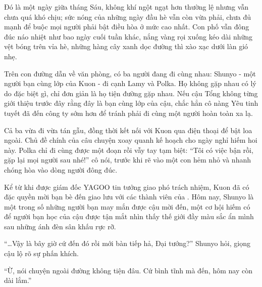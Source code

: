 \documentclass[../main.tex]{subfiles}
\begin{document}

Đó là một ngày giữa tháng Sáu, không khí ngột ngạt hơn thường lệ nhưng vẫn chưa quá khó chịu; sức nóng của những ngày đầu hè vẫn còn vừa phải, chưa đủ mạnh để buộc mọi người phải bật điều hòa ở mức cao nhất. Con phố vẫn đông đúc náo nhiệt như bao ngày cuối tuần khác, nắng vàng rọi xuống kéo dài những vệt bóng trên vỉa hè, những hàng cây xanh dọc đường thì xào xạc dưới làn gió nhẹ.

Trên con đường dẫn về văn phòng, có ba người đang đi cùng nhau: Shunyo - một người bạn cùng lớp của Kuon - đi cạnh Lamy và Polka. Họ không gặp nhau có lý do đặc biệt gì, chỉ đơn giản là họ tiện đường gặp nhau. Nếu cậu Tổng không từng giới thiệu trước đây rằng đây là bạn cùng lớp của cậu, chắc hẳn cô nàng Yêu tinh tuyết đã đến công ty sớm hơn để tránh phải đi cùng một người hoàn toàn xa lạ.

Cả ba vừa đi vừa tán gẫu, đồng thời kết nối với Kuon qua điện thoại để bật loa ngoài. Chủ đề chính của câu chuyện xoay quanh kế hoạch cho ngày nghỉ hiếm hoi này. Polka chỉ đi cùng được một đoạn rồi vẫy tay tạm biệt: ``Tôi có việc bận rồi, gặp lại mọi người sau nhé!'' cô nói, trước khi rẽ vào một con hẻm nhỏ và nhanh chóng hòa vào dòng người đông đúc.

Kể từ khi được giám đốc YAGOO tin tưởng giao phó trách nhiệm, Kuon đã có đặc quyền mời bạn bè đến giao lưu với các thành viên của \hll. Hôm nay, Shunyo là một trong số những người bạn may mắn được cậu mời đến, một cơ hội hiếm có để người bạn học của cậu được tận mắt nhìn thấy thế giới đầy màu sắc ẩn mình sau những ánh đèn sân khấu rực rỡ.

``\dots Vậy là bây giờ cứ đến đó rồi mới bàn tiếp hả, Đại tướng?'' Shunyo hỏi, giọng cậu lộ rõ sự phấn khích.

``Ừ, nói chuyện ngoài đường không tiện đâu. Cứ bình tĩnh mà đến, hôm nay còn dài lắm.''
\end{document}

